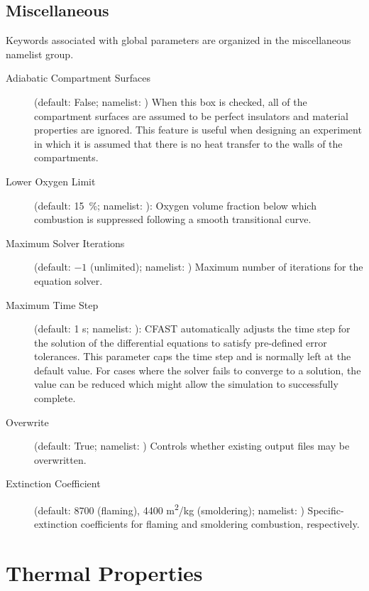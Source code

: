 \section{Miscellaneous}
\label{info:MISC}

Keywords associated with global parameters are organized in the miscellaneous namelist group.
\begin{description}
\item[Adiabatic Compartment Surfaces] (default: False; namelist: ) When this box is checked, all of the compartment surfaces are assumed to be perfect insulators and material properties are ignored. This feature is useful when designing an experiment in which it is assumed that there is no heat transfer to the walls of the compartments.

\item[Lower Oxygen Limit] (default: 15~\%; namelist: ):  Oxygen volume fraction below which combustion is suppressed following a smooth transitional curve.

\item[Maximum Solver Iterations] (default: $-1$ (unlimited); namelist: ) Maximum number of iterations for the equation solver.

\item[Maximum Time Step] (default: 1 s; namelist: ): CFAST automatically adjusts the time step for the solution of the differential equations to satisfy pre-defined error tolerances. This parameter caps the time step and is normally left at the default value. For cases where the solver fails to converge to a solution, the value can be reduced which might allow the simulation to successfully complete.

\item[Overwrite] (default: True; namelist: ) Controls whether existing output files may be overwritten.

\item[Extinction Coefficient] (default: 8700 (flaming), 4400 \unit{m^2/kg} (smoldering); namelist: ) Specific-extinction coefficients for flaming and smoldering combustion, respectively.
\end{description}





\chapter{Thermal Properties}
\label{info:MATL}

